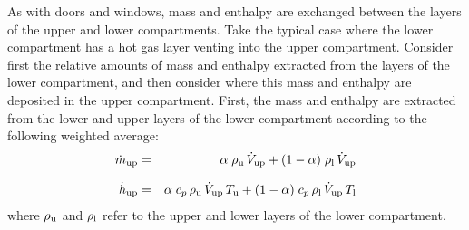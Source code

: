 \documentclass[12pt]{book}
\begin{document}
As with doors and windows, mass and enthalpy are exchanged between the layers of the upper and lower compartments. Take the typical case where the lower compartment has a hot gas layer venting into the upper compartment. Consider first the relative amounts of mass and enthalpy extracted from the layers of the lower compartment, and then consider where this mass and enthalpy are deposited in the upper compartment. First, the mass and enthalpy are extracted from the lower and upper layers of the lower compartment according to the following weighted average:
\begin{eqnarray}
  \dot{m}_{\rm up}  &=& \alpha \; \rho_{\rm u} \, \dot{V}_{\rm up} + (1-\alpha) \; \rho_{\rm l} \, \dot{V}_{\rm up}  \\[.1in]
  \dot{h}_{\rm up} &=& \alpha \; c_p \, \rho_{\rm u} \, \dot{V}_{\rm up} \, T_{\rm u} + (1-\alpha) \; c_p \, \rho_{\rm l} \, \dot{V}_{\rm up} \, T_{\rm l}
\end{eqnarray}
where $\rho_{\rm u}$ and $\rho_{\rm l}$ refer to the upper and lower layers of the lower compartment. 
\end{document}
